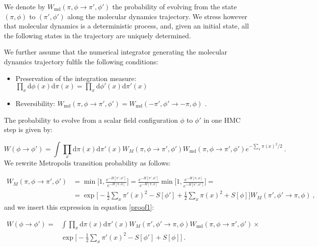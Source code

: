 We denote by $W_{\mathrm{md}}(\pi,\phi \to \pi',\phi')$ the probability of evolving from the state $(\pi,\phi)$ to $(\pi',\phi')$ along the molecular dynamics trajectory.  We stress however that molecular dynamics is a deterministic process, and, given an initial state, all the following states in the trajectory are uniquely determined.

We further assume that the numerical integrator generating the molecular dynamics trajectory fulfils the following conditions:

\begin{itemize}
\item Preservation of the integration measure: $ \prod_{x} \mathrm{d} \phi(x) \mathrm{d} \pi(x) =  \prod_{x} \mathrm{d} \phi'(x) \mathrm{d} \pi'(x)$
\item Reversibility: $W_{\mathrm{md}}(\pi,\phi \to \pi',\phi') = W_{\mathrm{md}}(-\pi',\phi' \to -\pi,\phi )$\: .
\end{itemize}


The probability to evolve from a scalar field configuration $\phi$ to $\phi'$ in one HMC step is given by:

\begin{equation}
W(\phi \to \phi') = \int \prod_{x} \mathrm{d} \pi(x) \mathrm{d} \pi'(x)  W_M(\pi,\phi \to \pi',\phi') W_{\mathrm{md}}(\pi,\phi \to \pi',\phi') e^{-\sum_x \pi(x)^2 /2} \: .
\label{proof1}
\end{equation}
%
We rewrite Metropolis transition probability as follows:

\begin{equation}
\begin{split}
W_M(\pi,\phi \to \pi',\phi') & = \min \biggl[ 1, \frac{e^{-H[\pi',\phi']}}{e^{-H[\pi,\phi]}} \biggr] = 
 \frac{e^{-H[\pi',\phi']}}{e^{-H[\pi,\phi]}} \min \biggl[ 1, \frac{e^{-H[\pi,\phi]}}{e^{-H[\pi',\phi']}} \biggr]  = \\
& = \exp \biggl[ - \frac{1}{2} \sum_x \pi'(x)^2 - S[\phi'] +  \frac{1}{2} \sum_x \pi(x)^2 + S[\phi] \biggr]  W_M(\pi',\phi' \to \pi,\phi) \: ,
\end{split}
\end{equation}
%
and we insert this expression in equation \ref{proof1}:

\begin{equation}
\begin{split}
W(\phi \to \phi') = & \int \prod_{x} \mathrm{d} \pi(x) \mathrm{d} \pi'(x) W_M(\pi',\phi' \to \pi,\phi)  W_{\mathrm{md}}(\pi,\phi \to \pi',\phi') \times \\
&  \exp \biggl[- \frac{1}{2} \sum_x \pi'(x)^2 - S[\phi'] + S[\phi] \biggr]  \:  .  
\end{split}
\end{equation}

